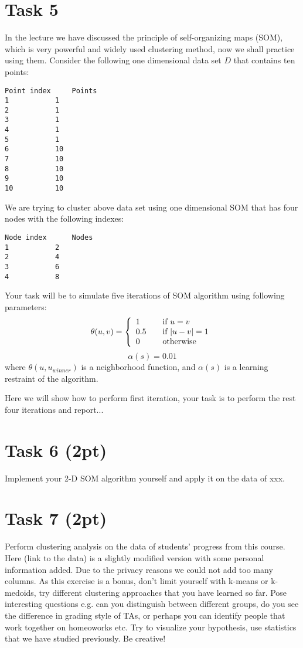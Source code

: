 \documentclass{article}
\begin{document}
\section*{Task 5}
In the lecture we have discussed the principle of self-organizing maps (SOM), which is very powerful and widely used clustering method, now we shall practice using them. Consider the following one dimensional data set $D$ that contains ten points: 
\begin{lstlisting}
Point index		Points
1			1
2			1
3			1
4			1
5			1
6			10
7			10
8			10
9			10
10			10
\end{lstlisting}
We are trying to cluster above data set using one dimensional SOM that has four nodes with the following indexes:
\begin{lstlisting}
Node index		Nodes
1			2
2			4
3			6
4			8
\end{lstlisting}
Your task will be to simulate five iterations of SOM algorithm using following parameters:
\[ \theta(u,v) = \left\{ 
  \begin{array}{l l}
    1 & \quad \text{if $u = v$}\\
    0.5 & \quad \text{if $|u - v| = 1$}\\
    0 & \quad \text{otherwise}
 \end{array} \right.\]
$$
\alpha(s) = 0.01
$$
where $\theta(u,u_{winner})$ is a neighborhood function, and $\alpha(s)$ is a learning restraint of the algorithm.

Here we will show how to perform first iteration, your task is to perform the rest four iterations and report...

\section*{Task 6 (2pt)}
Implement your 2-D SOM algorithm yourself and apply it on the data of xxx.

\section*{Task 7 (2pt)}
Perform clustering analysis on the data of students' progress from this course. Here (link to the data) is a slightly modified version with some personal information added. Due to the privacy reasons we could not add too many columns. As this exercise is a bonus, don't limit yourself with k-means or k-medoids, try different clustering approaches that you have learned so far. 
Pose interesting questions e.g. can you distinguish between different groups, do you see the difference in grading style of TAs, or perhaps you can identify people that work together on homeoworks etc. Try to visualize your hypothesis, use statistics that we have studied previously. Be creative!
\end{document}
